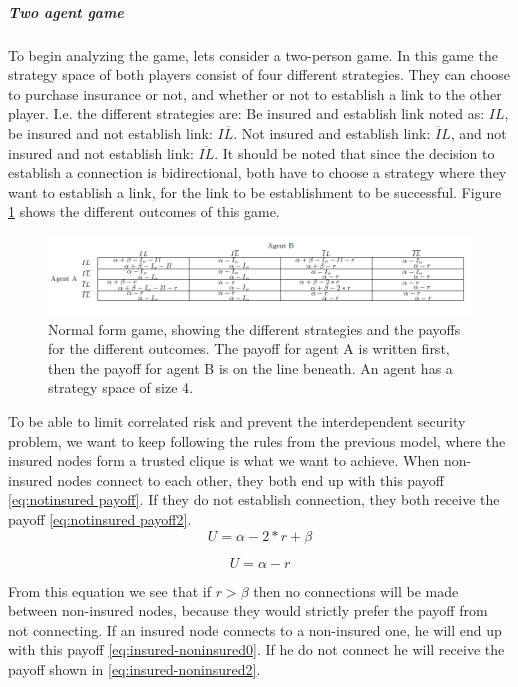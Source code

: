 \subparagraph{Two agent game}
To begin analyzing the game, lets consider a two-person game. In this game the strategy space of both players consist of four different strategies. They can choose to purchase insurance or not, and whether or not to establish a link to the other player. I.e. the different strategies are: Be insured and establish link noted as: $IL$, 
be insured and not establish link: $I\overline{L}$. Not insured and establish link: $\overline{I}L$, and not insured and not establish link: $\overline{IL}$. It should be noted that since the decision to establish a connection is bidirectional, both have to choose a strategy where they want to establish a link, for the link to be establishment to be successful.
Figure \ref{fig:FirstGameTheoryModel} shows the different outcomes of this game.

\begin{figure} %
\centering
\includegraphics[width=1.0\textwidth]{../Figures/FirstGameWithParameters.png}
\caption{\label{fig:FirstGameTheoryModel} Normal form game, showing the different strategies and the payoffs  for the different outcomes. The payoff for agent A is written first, then the payoff for agent B is on the line beneath.
 An agent has a strategy space of size 4. }

\end{figure}


To be able to limit correlated risk and prevent the interdependent security problem, we want to keep following the rules from the previous model, where the insured nodes form a trusted clique is what we want to achieve. 
When non-insured nodes connect to each other, they both end up with this payoff \ref{eq:notinsured payoff}. If they do not establish connection, they both receive the payoff \ref{eq:notinsured payoff2}.
\begin{equation}
U=\alpha - 2*r +\beta
\label{eq:notinsured payoff}
\end{equation}

\begin{equation}
U=\alpha - r
\label{eq:notinsured payoff2}
\end{equation}

From this equation we see that if $r>\beta$ then no connections will be made between non-insured nodes, because they would strictly prefer the payoff from not connecting.
If an insured node connects to a non-insured one, he will end up with this payoff \ref{eq:insured-noninsured0}. If he do not connect he will receive the payoff shown in \ref{eq:insured-noninsured2}.

